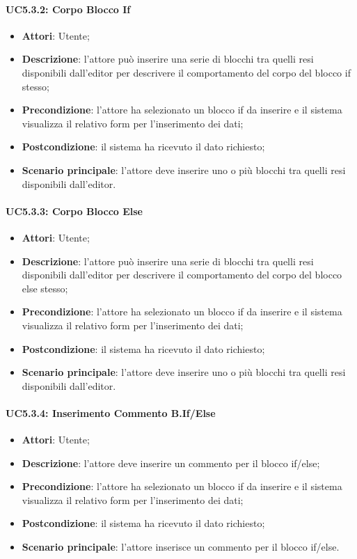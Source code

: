 \paragraph{UC5.3.2: Corpo Blocco If}
\label{UC5.3.2}
\begin{itemize}
\item \textbf{Attori}: Utente;
\item \textbf{Descrizione}: l'attore può inserire una serie di blocchi tra quelli resi disponibili dall'editor per descrivere il comportamento del corpo del blocco if stesso;	
\item \textbf{Precondizione}: l'attore ha selezionato un blocco if da inserire e il sistema visualizza il relativo form per l'inserimento dei dati;	
\item \textbf{Postcondizione}: il sistema ha ricevuto il dato richiesto;	
\item \textbf{Scenario principale}:
l'attore deve inserire uno o più blocchi tra quelli resi disponibili dall'editor.	
\end{itemize}

\paragraph{UC5.3.3: Corpo Blocco Else	}
\label{UC5.3.3}
\begin{itemize}
\item \textbf{Attori}: Utente;
\item \textbf{Descrizione}: l'attore può inserire una serie di blocchi tra quelli resi disponibili dall'editor per descrivere il comportamento del corpo del blocco else stesso;	
\item \textbf{Precondizione}: l'attore ha selezionato un blocco if da inserire e il sistema visualizza il relativo form per l'inserimento dei dati;	
\item \textbf{Postcondizione}: il sistema ha ricevuto il dato richiesto;	
\item \textbf{Scenario principale}:
l'attore deve inserire uno o più blocchi tra quelli resi disponibili dall'editor.	
\end{itemize}

\paragraph{UC5.3.4: Inserimento Commento B.If/Else	}
\label{UC5.3.4}
\begin{itemize}
\item \textbf{Attori}: Utente;
\item \textbf{Descrizione}: l'attore deve inserire un commento per il blocco if/else;	
\item \textbf{Precondizione}: l'attore ha selezionato un blocco if da inserire e il sistema visualizza il relativo form per l'inserimento dei dati;	
\item \textbf{Postcondizione}: il sistema ha ricevuto il dato richiesto;	
\item \textbf{Scenario principale}:
l'attore inserisce un commento per il blocco if/else.
\end{itemize}

